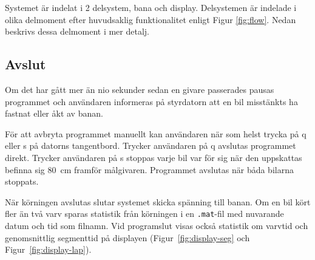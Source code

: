 Systemet är indelat i 2 delsystem, bana och display. Delsystemen är indelade i olika delmoment efter huvudsaklig funktionalitet enligt Figur
\ref{fig:flow}. Nedan beskrivs dessa delmoment i mer detalj.






\subsection{Avslut}

Om det har gått mer än nio sekunder sedan en givare passerades pausas programmet
och användaren informeras på styrdatorn att en bil misstänkts ha fastnat eller
åkt av banan. 

För att avbryta programmet manuellt kan användaren när som helst trycka på q
eller s på datorns tangentbord. Trycker användaren på q avslutas programmet
direkt. Trycker användaren på s stoppas varje bil var för sig när den uppskattas
befinna sig 80~cm framför målgivaren. Programmet avslutas när båda bilarna
stoppats.

När körningen avslutas slutar systemet skicka spänning till banan.  Om en bil
kört fler än två varv sparas statistik från körningen i en \texttt{.mat}-fil med
nuvarande datum och tid som filnamn. Vid programslut visas också statistik om
varvtid och genomsnittlig segmenttid på displayen (Figur~\ref{fig:display-seg}
och Figur~\ref{fig:display-lap}).

